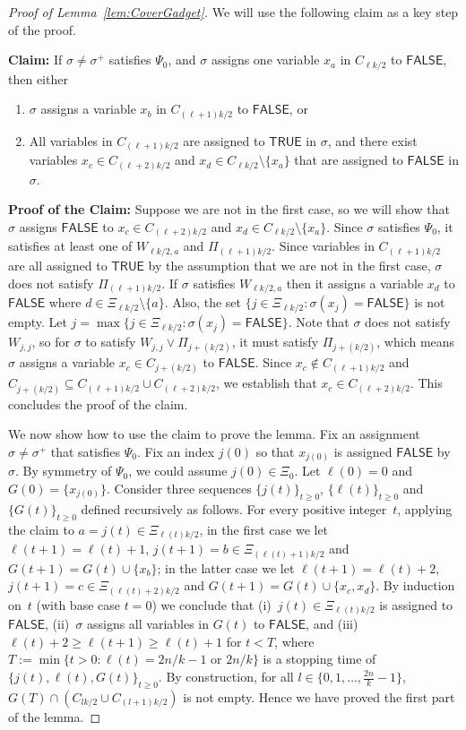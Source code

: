 \documentclass[11pt]{article}
\theoremstyle{definition}
\theoremstyle{remark}
\def\TRUE{\mathsf{TRUE}}
\def\FALSE{\mathsf{FALSE}}
\begin{document}
\begin{proof}[Proof of Lemma~\ref{lem:CoverGadget}]
We will use the following claim as a key step of the proof.


{\bf Claim:} If  $\sigma\neq\sigma^+$ satisfies $\Psi_0$, and $\sigma$ assigns one variable $x_a$ in $C_{\ell k/2}$ to $\FALSE$, then either
\begin{enumerate}
    \item $\sigma$ assigns a variable $x_b$ in $C_{(\ell+1)k/2}$ to $\FALSE$, or
    \item All variables in $C_{(\ell+1)k/2}$ are assigned to $\TRUE$ in $\sigma$, and there exist variables $x_c\in C_{(\ell +2)k/2}$ and $x_d\in C_{\ell k/2}\setminus\{x_a\}$ that are assigned to $\FALSE$ in $\sigma$.
\end{enumerate}

{\bf Proof of the Claim:} 
Suppose we are not in the first case, so we will show that $\sigma$ assigns $\FALSE$ to $x_c\in C_{(\ell +2)k/2}$ and $x_d\in C_{\ell k/2}\setminus\{x_a\}$. 
Since $\sigma$ satisfies $\Psi_0$, 
it satisfies at least one of $W_{\ell k/2,a}$ and $\Pi_{(\ell+1)k/2}$. 
Since variables in $C_{(\ell+1)k/2}$ are all assigned to $\TRUE$ by the assumption that we are not in the first case, $\sigma$ does not satisfy $\Pi_{(\ell+1)k/2}$. 
If $\sigma$ satisfies $W_{\ell k/2,a}$ then it assigns a variable 
$x_{d}$ to $\FALSE$ where $d \in \Xi_{\ell k/2} \setminus \{a\}$.
Also, the set $\{j\in \Xi_{\ell k/2}: \sigma(x_j)=\FALSE\}$ is not empty.
Let $j=\max\{j\in \Xi_{\ell k/2}: \sigma(x_j)=\FALSE\}$.
Note that $\sigma$ does not satisfy $W_{j,j}$, so for $\sigma$ to satisfy $W_{j,j} \vee \Pi_{j+(k/2)}$, it must satisfy $\Pi_{j+(k/2)}$, which means $\sigma$
assigns a variable $x_c\in C_{j+(k/2)}$ to $\FALSE$.
Since $x_c\notin C_{(\ell+1)k/2}$ and $C_{j+(k/2)}\subseteq C_{(\ell+1)k/2} \cup C_{(\ell+2)k/2}$, we establish that $x_c\in  C_{(\ell+2)k/2}$. This concludes the proof of the claim.



We now show how to use the claim to prove the lemma. 
Fix an assignment $\sigma \neq \sigma^+$ that satisfies $\Psi_0$.
Fix an index $j(0)$ so that $x_{j(0)}$  is assigned $\FALSE$ by~$\sigma$. 
By symmetry of $\Psi_0$, we could assume $j(0)\in \Xi_0$. Let $\ell(0)=0$ and $G(0)=\{x_{j(0)}\}$.
Consider three sequences $\{j(t)\}_{t\ge 0}$, $\{\ell(t)\}_{t\ge 0}$ and $\{G(t)\}_{t\ge 0}$ defined recursively as follows. 
For every positive integer~$t$,
applying the claim to $a=j(t)\in \Xi_{\ell(t)k/2}$, 
in the first case we let $\ell(t+1)=\ell(t)+1$, $j(t+1)=b\in \Xi_{(\ell(t)+1)k/2} $
and $G(t+1)=G(t)\cup \{x_b\}$; in the latter case 
we let $\ell(t+1) = \ell(t)+2$, $j(t+1)=c\in \Xi_{(\ell(t)+2)k/2}$ and $G(t+1)=G(t)\cup \{x_c, x_d\}$. 
By induction on~$t$ (with base case $t=0$) 
we conclude that (i)~$j(t)\in \Xi_{\ell(t)k/2}$ is assigned to $\FALSE$,  (ii)~$\sigma$ assigns all variables in $G(t)$ to $\FALSE$, and (iii) $\ell(t) +2 \ge \ell(t+1) \ge \ell(t) +1$ for $t<T$, where $T:=\min\{t>0: \ell(t)=2n/k-1 \text{ or } 2n/k\}$ is a stopping time of $\{j(t), \ell(t), G(t)\}_{t\ge 0}$.
By construction, for all 
$l\in \{0,1,\ldots,\frac{2n}{k}-1\}$, $G(T)\cap (C_{lk/2} \cup C_{(l+1)k/2})$ is not empty. Hence we have proved the first part of the lemma. 


\end{proof}
\end{document}
